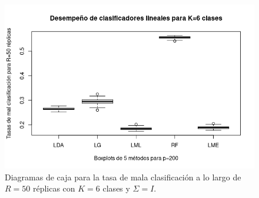 \documentclass{report}
\begin{document}
\begin{figure} [h]
\begin{multicols}{2}
  		\caption*{$p=100$}
  		\includegraphics[width=\linewidth]{6_clases_p200_sigma_I}\par 
  		\caption*{$p=200$}
  		
  	\end{multicols}
  	\caption{ Diagramas de caja para la tasa de mala clasificación  a lo largo de $R=50$ réplicas con $K=6$ clases y $\Sigma=I$. }
  	\label{boxk6sigmaiden}
  \end{figure}
  
\end{document}
